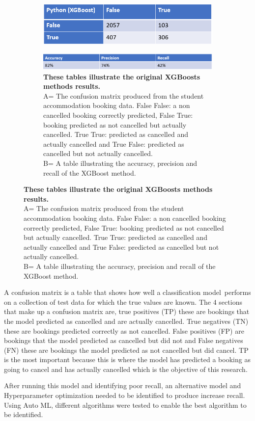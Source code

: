 \begin{figure}[H]
 \centering
  \begin{subfigure}{A\textwidth}
    \includegraphics[width=10cm]{figures/python_xgboost.png}
  \end{subfigure}

  \centering
  \begin{subfigure}{B\textwidth}
    \includegraphics[width=10cm]{figures/python_recall}
    \caption{\textbf{These tables illustrate the original XGBoosts methods results.}\vspace{2mm} \\ A= The confusion matrix produced from the student accommodation booking data. False False: a non cancelled booking correctly predicted, False True: booking predicted as not cancelled but actually cancelled. True True: predicted as cancelled and actually cancelled and True False: predicted as cancelled but not actually cancelled.\vspace{2mm} \\B= A table illustrating the accuracy, precision and recall of the XGBoost method.} \label{fig:1b}
  \end{subfigure}
\end{figure}



A confusion matrix is a table that shows how well a classification model performs on a collection of test data for which the true values are known. The 4 sections that make up a confusion matrix are, true positives (TP) these are bookings that the model predicted as cancelled and are actually cancelled. True negatives (TN) these are bookings predicted correctly as not cancelled. False positives (FP) are bookings that the model predicted as cancelled but did not and False negatives (FN) these are bookings the model predicted as not cancelled but did cancel. TP is the most important because this is where the model has predicted a booking as going  to cancel and has actually cancelled which is the objective of this research.

After running this model and identifying poor recall, an alternative model and Hyperparameter optimization needed to be identified to produce increase recall. Using Auto ML, different algorithms were tested to enable the best algorithm to be identified. 

